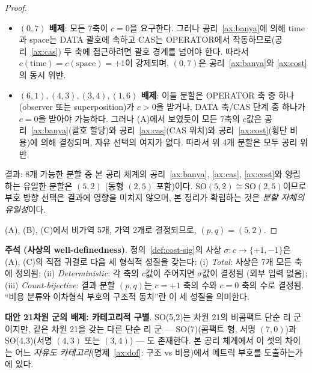 \documentclass[entropy,article,submit,pdftex,oneauthor]{Definitions/mdpi}
\begin{document}
\begin{proof}
\begin{itemize}
\item \textbf{$(0,7)$ 배제}: 모든 7축이 $c = 0$을 요구한다. 그러나 공리~\ref{ax:banya}에 의해 time과 space는 DATA 괄호에 속하고 CAS는 OPERATOR에서 작동하므로(공리~\ref{ax:cas}) 두 축에 접근하려면 괄호 경계를 넘어야 한다. 따라서 $c(\text{time}) = c(\text{space}) = +1$이 강제되며, $(0,7)$은 공리~\ref{ax:banya}와 \ref{ax:cost}의 동시 위반.

\item \textbf{$(6,1), (4,3), (3,4), (1,6)$ 배제}: 이들 분할은 OPERATOR 축 중 하나(observer 또는 superposition)가 $c > 0$을 받거나, DATA 축/CAS 단계 중 하나가 $c = 0$을 받아야 가능하다. 그러나 (A)에서 보였듯이 모든 7축의 $c$값은 공리~\ref{ax:banya}(괄호 할당)와 공리~\ref{ax:cas}(CAS 위치)와 공리~\ref{ax:cost}(횡단 비용)에 의해 결정되며, 자유 선택의 여지가 없다. 따라서 위 4개 분할은 모두 공리 위반.
\end{itemize}
결과: 8개 가능한 분할 중 본 공리 체계의 공리~\ref{ax:banya}, \ref{ax:cas}, \ref{ax:cost}와 양립하는 유일한 분할은 $(5,2)$ (동형 $(2,5)$ 포함)이다. $\mathrm{SO}(5,2) \cong \mathrm{SO}(2,5)$이므로 부호 방향 선택은 결과에 영향을 미치지 않으며, 본 정리가 확립하는 것은 \emph{분할 자체의 유일성}이다.

(A), (B), (C)에서 비가역 5개, 가역 2개로 결정되므로, $(p, q) = (5, 2)$.
\end{proof}

\textbf{주석 (사상의 well-definedness)}. 정의~\ref{def:cost-sig}의 사상 $\sigma: c \to \{+1, -1\}$은 (A), (C)의 직접 귀결로 다음 세 형식적 성질을 갖는다: (i) \emph{Total}: 사상은 7개 모든 축에 정의됨; (ii) \emph{Deterministic}: 각 축의 $c$값이 주어지면 $\sigma$값이 결정됨 (외부 입력 없음); (iii) \emph{Count-bijective}: 결과 분할 $(p,q)$는 $c=+1$ 축의 수와 $c=0$ 축의 수로 결정됨. ``비용 분류와 이차형식 부호의 구조적 동치''란 이 세 성질을 의미한다.

\textbf{대안 21차원 군의 배제: 카테고리적 구별}. SO(5,2)는 차원 21의 비콤팩트 단순 리 군이지만, 같은 차원 21을 갖는 다른 단순 리 군 — SO(7)(콤팩트 형, 서명 $(7,0)$)과 SO(4,3)(서명 $(4,3)$ 또는 $(3,4)$) — 도 존재한다. 본 공리 체계에서 이 셋의 차이는 어느 \emph{자유도 카테고리}(명제~\ref{ax:dof}: 구조 vs 비용)에서 메트릭 부호를 도출하는가에 있다.
\end{document}
